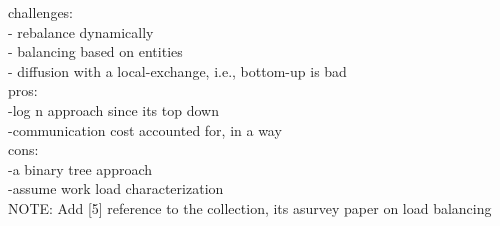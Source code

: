 challenges:\\
- rebalance dynamically\\
- balancing based on entities\\
- diffusion with a local-exchange, i.e., bottom-up is bad\\
pros:\\
-log n approach since its top down\\
-communication cost accounted for, in a way\\
cons:\\
-a binary tree approach\\
-assume work load characterization\\
NOTE: Add [5] reference to the collection, its asurvey paper on load balancing\\

